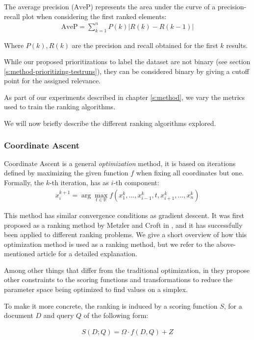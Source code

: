 The average precision ($\text{AveP}$) represents the area under the curve of a precision-recall
plot when considering the first ranked elements:
\begin{align*}
\text{AveP} = \sum_{k=1}^{n} P(k)|R(k)-R(k-1)|
\end{align*}

Where $P(k), R(k)$ are the precision and recall obtained for the first $k$ results.

While our proposed prioritizations to label the dataset are not binary (see section \ref{s:method-prioritizing-testruns}),
they can be considered binary by giving a cutoff point for the assigned relevance.


As part of our experiments described in chapter \ref{s:method}, we vary the metrics
used to train the ranking algorithms. 

We will now briefly describe the different ranking algorithms explored.

\subsubsection{Coordinate Ascent}
Coordinate Ascent is a general \textit{optimization} method, it is based on iterations defined
by maximizing the given function $f$ when fixing all coordinates but one. Formally, the $k$-th iteration,
has as $i$-th component:
\begin{align*}
x^{k+1}_i = \arg \max_{t\in\mathbb{R}} f(x^{k}_1, ..., x^{k}_{i-1}, t, x^{k}_{i+1}, ..., x^k_n)
\end{align*}

This method has similar convergence conditions as gradient descent. It was first proposed as a
ranking method by Metzler and Croft in \cite{Metzler2006LinearFM}, and it has successfully been applied
to different ranking problems. We give a short overview of how this optimization method is used as
a ranking method, but we refer to the above-mentioned article for a detailed explanation.

Among other things that differ from the traditional optimization, in \cite{Metzler2006LinearFM} they propose 
other constraints to the scoring functions and transformations to reduce the parameter space 
being optimized to find values on a simplex.

To make it more concrete, the ranking is induced by a scoring function $S$, for a document $D$ and query $Q$
 of the following form:

\begin{align*}
S(D; Q) = \Omega \cdot f(D, Q) + Z
\end{align*}

